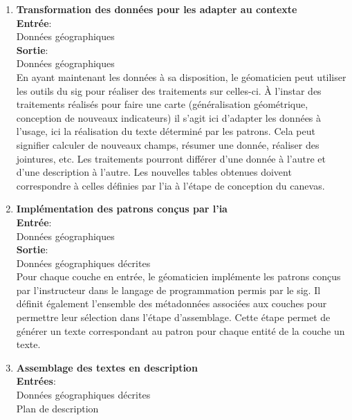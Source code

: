 \begin{enumerate}
    \item \textbf{Transformation des données pour les adapter au contexte}\\
            \textbf{Entrée}:\\
            \hspace*{1cm}Données géographiques\\
            \textbf{Sortie}:\\
            \hspace*{1cm}Données géographiques\\
            En ayant maintenant les données à sa disposition, le géomaticien peut utiliser les outils du \gls{sig} pour réaliser des traitements sur celles-ci. À l’instar des traitements réalisés pour faire une carte (généralisation géométrique, conception de nouveaux indicateurs) il s’agit ici d’adapter les données à l’usage, ici la réalisation du texte déterminé par les patrons. Cela peut signifier calculer de nouveaux champs, résumer une donnée, réaliser des jointures, etc. Les traitements pourront différer d’une donnée à l’autre et d’une description à l’autre. Les nouvelles tables obtenues doivent correspondre à celles définies par l’\gls{ia} à l’étape de conception du canevas.
    \item \textbf{Implémentation des patrons conçus par l’\gls{ia}}\\
        \textbf{Entrée}:\\ 
        \hspace*{1cm}Données géographiques\\
        \textbf{Sortie}:\\
        \hspace*{1cm}Données géographiques décrites\\
        Pour chaque couche en entrée, le géomaticien implémente les patrons conçus par l’instructeur dans le langage de programmation permis par le \gls{sig}. Il définit également l’ensemble des métadonnées associées aux couches pour permettre leur sélection dans l’étape d’assemblage. Cette étape permet de générer un texte correspondant au patron pour chaque entité de la couche un texte.
    \newpage
    \item \textbf{Assemblage des textes en description}\\
        \textbf{Entrées}:\\
        \hspace*{1cm}Données géographiques décrites\\
        \hspace*{1cm}Plan de description \\

\end{enumerate}
